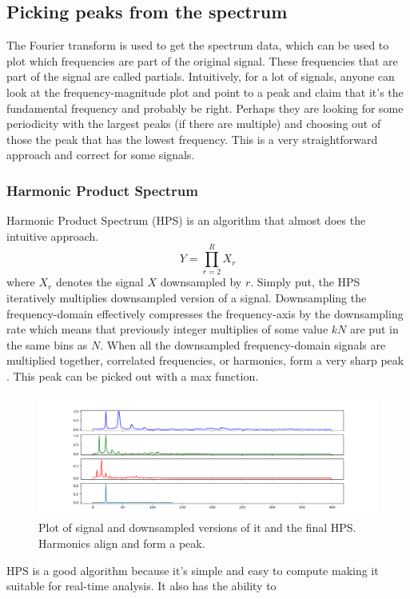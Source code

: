 \subsection{Picking peaks from the spectrum}
The Fourier transform is used to get the spectrum data, which can be used to plot which frequencies are part of the original signal. These frequencies that are part of the signal are called partials. Intuitively, for a lot of signals, anyone can look at the frequency-magnitude plot and point to a peak and claim that it's the fundamental frequency and probably be right. Perhaps they are looking for some periodicity with the largest peaks (if there are multiple) and choosing out of those the peak that has the lowest frequency. This is a very straightforward approach and correct for some signals. 

\subsubsection{Harmonic Product Spectrum}
Harmonic Product Spectrum (HPS) is an algorithm that almost does the intuitive approach. 
$$Y = \prod_{r=2}^R X_r$$ where $X_r$ denotes the signal $X$ downsampled by $r$. Simply put, the HPS iteratively multiplies downsampled version of a signal. Downsampling the frequency-domain effectively compresses the frequency-axis by the downsampling rate which means that previously integer multiplies of some value $kN$ are put in the same bins as $N$. When all the downsampled frequency-domain signals are multiplied together, correlated frequencies, or harmonics, form a very sharp peak \cite{McLeod2008}. This peak can be picked out with a max function.

\begin{figure}[ht]
    \centering
    \includegraphics[width=\textwidth]{./images/hps.png}
    \caption{Plot of signal and downsampled versions of it and the final HPS. Harmonics align and form a peak. \label{fig:hps}}
\end{figure}

HPS is a good algorithm because it's simple and easy to compute making it suitable for real-time analysis. It also has the ability to 

